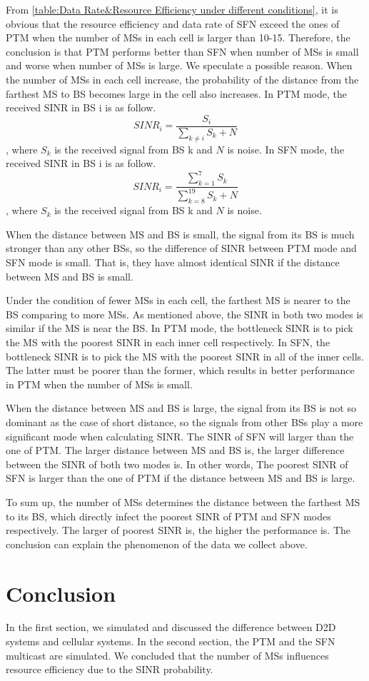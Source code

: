 \documentclass[conference]{IEEEtran}
\begin{document}
From \cref{table:Data Rate&Resource Efficiency under different conditions}, it is obvious that the resource efficiency and data rate of SFN exceed the ones of PTM when the number of MSs in each cell is larger than 10-15. Therefore, the conclusion is that PTM performs better than SFN when number of MSs is small and worse when number of MSs is large.
We speculate a possible reason. When the number of MSs in each cell increase, the probability of the distance from the farthest MS to BS becomes large in the cell also increases.
In PTM mode, the received SINR in BS i is as follow.
\begin{equation}\label{eqn:SINR in PTM}
    SINR_i = \frac{S_i}{\sum_{k\neq{i}}S_k+N}
\end{equation}
, where $S_k$ is the received signal from BS k and $N$ is noise.
In SFN mode, the received SINR in BS i is as follow.
\begin{equation}\label{eqn:SINR in SFN}
    SINR_i = \frac{\sum_{k=1}^{7}S_k}{\sum_{k=8}^{19}S_k+N}
\end{equation}
, where $S_k$ is the received signal from BS k and $N$ is noise.

When the distance between MS and BS is small, the signal from its BS is much stronger than any other BSs, so the difference of SINR between PTM mode and SFN mode is small. That is, they have almost identical SINR if the distance between MS and BS is small.

Under the condition of fewer MSs in each cell, the farthest MS is nearer to the BS comparing to more MSs. As mentioned above, the SINR in both two modes is similar if the MS is near the BS. In PTM mode, the bottleneck SINR is to pick the MS with the poorest SINR in each inner cell respectively. In SFN, the bottleneck SINR is to pick the MS with the poorest SINR in all of the inner cells. The latter must be poorer than the former, which results in better performance in PTM when the number of MSs is small.

When the distance between MS and BS is large, the signal from its BS is not so dominant as the case of short distance, so the signals from other BSs play a more significant mode when calculating SINR. The SINR of SFN will larger than the one of PTM. The larger distance between MS and BS is, the larger difference between the SINR of both two modes is. In other words, The poorest SINR of SFN is larger than the one of PTM if the distance between MS and BS is large.

To sum up, the number of MSs determines the distance between the farthest MS to its BS, which directly infect the poorest SINR of PTM and SFN modes respectively. The larger of poorest SINR is, the higher the performance is. The conclusion can explain the phenomenon of the data we collect above.

\section{Conclusion}
In the first section, we simulated and discussed the difference between D2D systems and cellular systems. In the second section, the PTM and the SFN multicast are simulated. We concluded that the number of MSs influences resource efficiency due to the SINR probability.
\end{document}
